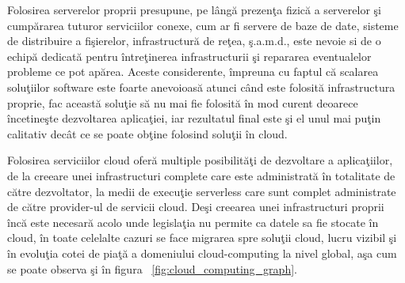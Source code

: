 \documentclass[a4paper,12pt]{report}
\begin{document}
Folosirea serverelor proprii presupune, pe lângă prezenţa fizică a serverelor şi cumpărarea tuturor serviciilor conexe, cum ar fi servere de baze de date, sisteme de distribuire a fişierelor, infrastructură de reţea, ş.a.m.d., este nevoie si de o echipă dedicată pentru întreţinerea infrastructurii şi repararea eventualelor probleme ce pot apărea. Aceste considerente, împreuna cu faptul că scalarea soluţiilor software este foarte anevoioasă atunci când este folosită infrastructura proprie, fac această soluţie să nu mai fie folosită în mod curent deoarece încetineşte dezvoltarea aplicaţiei, iar rezultatul final este şi el unul mai puţin calitativ decât ce se poate obţine folosind soluţii în cloud. 
\par
Folosirea serviciilor cloud oferă multiple posibilităţi de dezvoltare a aplicaţiilor, de la creeare unei infrastructuri complete care este administrată în totalitate de către dezvoltator, la medii de execuţie serverless care sunt complet administrate de către provider-ul de servicii cloud. 
Deşi creearea unei infrastructuri proprii încă este necesară acolo unde legislaţia nu permite ca datele sa fie stocate în cloud, în toate celelalte cazuri se face migrarea spre soluţii cloud, lucru vizibil şi în evoluţia cotei de piaţă a domeniului cloud-computing la nivel global, aşa cum se poate observa şi în figura ~\ref{fig:cloud_computing_graph}. 
\end{document}
